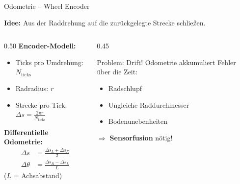 \documentclass[%
  aspectratio=169,
  10pt
]{beamer}
\begin{document}
\begin{frame}{Odometrie -- Wheel Encoder}

\textbf{Idee:} Aus der Raddrehung auf die zurückgelegte Strecke schließen.

\vspace{2mm}
\begin{columns}[T]
  \begin{column}{0.50\textwidth}
    \textbf{Encoder-Modell:}
    \begin{itemize}
      \item Ticks pro Umdrehung: $N_\mathrm{ticks}$
      \item Radradius: $r$
      \item Strecke pro Tick: $\Delta s = \frac{2\pi r}{N_\mathrm{ticks}}$
    \end{itemize}

    \vspace{2mm}
    \textbf{Differentielle Odometrie:}
    \begin{align*}
      \Delta s &= \frac{\Delta s_L + \Delta s_R}{2} \\
      \Delta \theta &= \frac{\Delta s_R - \Delta s_L}{L}
    \end{align*}
    ($L$ = Achsabstand)
  \end{column}
  \begin{column}{0.45\textwidth}
    \begin{alertblock}{Problem: Drift!}
      Odometrie akkumuliert Fehler über die Zeit:
      \begin{itemize}
        \item Radschlupf
        \item Ungleiche Raddurchmesser
        \item Bodenunebenheiten
      \end{itemize}
      $\Rightarrow$ \textbf{Sensorfusion} nötig!
    \end{alertblock}
  \end{column}
\end{columns}

\end{frame}
\end{document}
